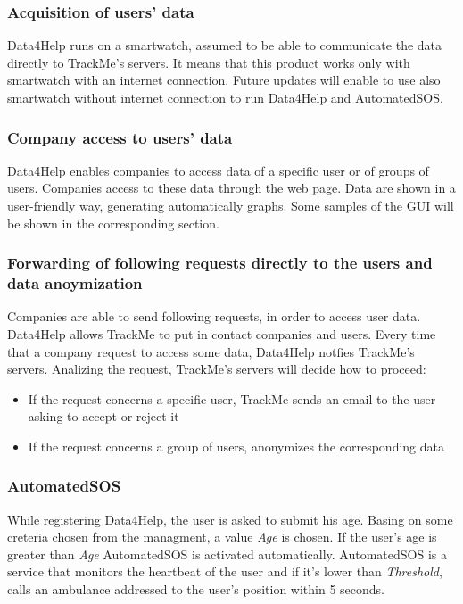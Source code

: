 \documentclass{article}
\begin{document}
\subsubsection{Acquisition of users' data}
Data4Help runs on a smartwatch, assumed to be able to communicate the data directly to TrackMe's servers. It means that this product works only with smartwatch with an internet connection. Future updates will enable to use also smartwatch without internet connection to run Data4Help and AutomatedSOS.
\subsubsection{Company access to users' data}
Data4Help enables companies to access data of a specific user or of groups of users. Companies access to these data through the web page. Data are shown in a user-friendly way, generating automatically graphs. Some samples of the GUI will be shown in the corresponding section.
\subsubsection{Forwarding of following requests directly to the users and data anoymization}
Companies are able to send following requests, in order to access user data. Data4Help allows TrackMe to put in contact companies and users. Every time that a company request to access some data, Data4Help notfies TrackMe's servers. Analizing the request, TrackMe's servers will decide how to proceed:\\
\begin{itemize}
\item If the request concerns a specific user, TrackMe sends an email to the user asking to accept or reject it
\item If the request concerns a group of users, anonymizes the corresponding data 
\end{itemize}
\subsubsection{AutomatedSOS}
While registering Data4Help, the user is asked to submit his age. Basing on some creteria chosen from the managment, a value \emph{Age} is chosen. If the user's age is greater than \emph{Age} AutomatedSOS is activated automatically. AutomatedSOS is a service that monitors the heartbeat of the user and if it's lower than \emph{Threshold}, calls an ambulance addressed to the user's position within 5 seconds.
\end{document}
